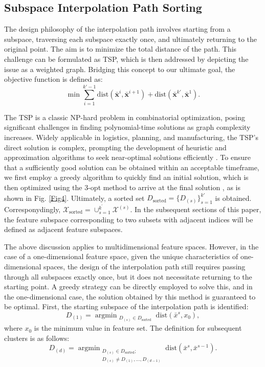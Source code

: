 \documentclass[lettersize,journal]{IEEEtran}
\begin{document}
\subsection{Subspace Interpolation Path Sorting}
The design philosophy of the interpolation path involves starting 
from a subspace, traversing each subspace exactly once, and 
ultimately returning to the original point. The aim is to minimize 
the total distance of the path. This challenge can be formulated 
as TSP, which is then addressed 
by depicting the issue as a weighted graph. Bridging this concept 
to our ultimate goal, the objective function is defined as:
\begin{equation}
\label{eq2}
\min{\sum\limits_{i=1}^{k'-1}\text{dist}(\boldsymbol{\bar{x}}^i,
\boldsymbol{\bar{x}}^{i+1})}+\text{dist}(\boldsymbol{\bar{x}}^{k'},
\boldsymbol{\bar{x}}^1). 
\end{equation}

The TSP is a classic NP-hard problem 
in combinatorial optimization, posing significant challenges in 
finding polynomial-time solutions as graph complexity increases. 
Widely applicable in logistics, planning, and manufacturing, 
the TSP's direct solution is complex, prompting the development 
of heuristic and approximation algorithms to seek near-optimal 
solutions efficiently \cite{bib56,bib57}. To ensure that a sufficiently good 
solution can be obtained within an acceptable timeframe, we first 
employ a greedy algorithm to quickly find an initial solution, 
which is then optimized using the 3-opt method to arrive at the 
final solution \cite{bib61,bib64}, as is shown 
in Fig. \ref{Fig4}. Ultimately, a sorted set 
$D_\text{sorted}=\{D_{(s)}\}_{s=1}^{k'}$ is obtained. Corresponydingly, $\mathcal{X}_{\text{sorted}}=\cup_{s=1}^{k^\prime}\mathcal{X}^{(s)}$. In the subsequent sections of this paper, the feature 
subspace corresponding to two subsets with adjacent indices will be 
defined as adjacent feature subspaces.

The above discussion applies to multidimensional feature spaces. 
However, in the case of a one-dimensional feature space, given 
the unique characteristics of one-dimensional spaces, the design 
of the interpolation path still requires passing through all 
subspaces exactly once, but it does not necessitate returning to 
the starting point. A greedy strategy can be directly employed to 
solve this, and in the one-dimensional case, the solution obtained 
by this method is guaranteed to be optimal. First, the starting 
subspace of the interpolation path is identified:
\begin{equation}
\label{eq3}
D_{(1)}=\mathop{\text{argmin}}_{\substack{D_{(s)}\in D_{\text{sorted}}}}
\text{dist}({\bar{x}}^s,{x}_0), 
\end{equation}
where $x_0$ is the minimum value in feature set. The definition 
for subsequent clusters is as follows:
\begin{equation}
\label{eq4}
D_{(d)} = \mathop{\text{argmin}}_{\substack{D_{(s)} \in D_{\text{sorted}}; \\ 
D_{(s)} \neq D_{(1)}, \ldots, D_{(d-1)}}}\text{dist}\left(\bar{x}^s, 
\bar{x}^{s-1}\right).
\end{equation}
\end{document}
